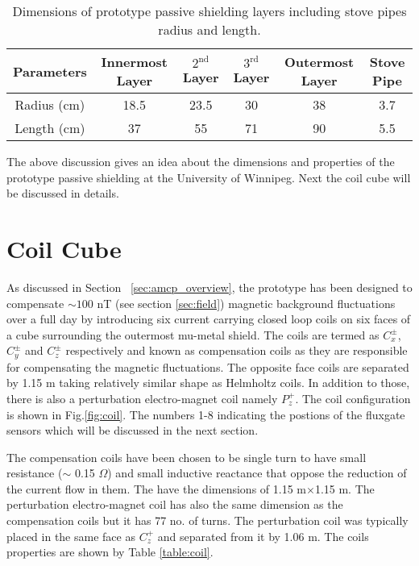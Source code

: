 \begin{table} [!htb]
    \centering
    \begin{tabular} { |c|c|c|c|c|c|} 
        \hline
        Parameters & Innermost Layer & $\mathrm{2^{nd}}$ Layer & $\mathrm{3^{rd}}$ Layer & Outermost Layer & Stove Pipe\\
        \hline\hline
        Radius (cm) & 18.5 & 23.5 & 30 & 38 & 3.7 \\ 
        \hline
        Length (cm) & 37 & 55 & 71 & 90 & 5.5 \\ 
         \hline
    \end{tabular}
    \caption[Dimensions of prototype passive shielding layers]{Dimensions of prototype passive shielding layers including stove pipes radius and length.}\label{table:mu-metal}
\end{table}

\FloatBarrier
The above discussion gives an idea about the dimensions and properties of the prototype passive shielding at the University of Winnipeg. Next the coil cube will be discussed in details.

\section{Coil Cube}\label{sec:cube}
As discussed in Section ~\ref{sec:amcp_overview}, the prototype has been designed to compensate $\sim 100$ nT (see section \ref{sec:field}) magnetic background fluctuations over a full day by introducing six current carrying closed loop coils on six faces of a cube surrounding the outermost mu-metal shield. The coils are termed as $C_x^\pm$, $C_y^\pm$ and $C_z^\pm$ respectively and known as compensation coils as they are responsible for compensating the magnetic fluctuations. The opposite face coils are separated by 1.15 m taking relatively similar shape as  Helmholtz coils. In addition to those, there is also a perturbation electro-magnet coil namely $P_z^+$. The coil configuration is shown in Fig.\ref{fig:coil}. The numbers 1-8 indicating the postions of the fluxgate sensors which will be discussed in the next section.



\FloatBarrier
The compensation coils have been chosen to be single turn to have small resistance ($\sim$ 0.15 $\Omega$) and small inductive reactance that oppose the reduction of the current flow in them. The have the dimensions of 1.15 m$\times$1.15 m. The perturbation electro-magnet coil has also the same dimension as the compensation coils but it has 77 no. of turns. The perturbation coil was typically placed in the same face as $C_z^+$ and separated from it by 1.06 m. The coils properties are shown by Table \ref{table:coil}. 

